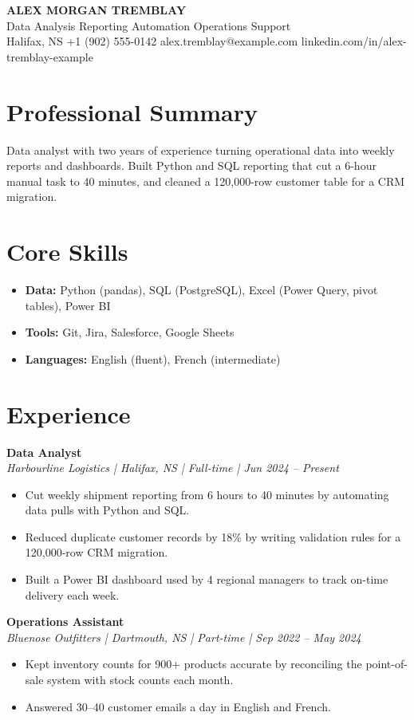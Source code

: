 \documentclass[11pt,letterpaper]{article}
\newcommand{\entry}[2]{\textbf{#1}\\\textit{#2}\par}
\begin{document}
\begin{center}
  {\LARGE\bfseries ALEX MORGAN TREMBLAY}\\[2pt]
  Data Analysis \textbar{} Reporting Automation \textbar{} Operations Support\\[2pt]
  Halifax, NS \textbar{} +1 (902) 555-0142 \textbar{} alex.tremblay@example.com \textbar{} linkedin.com/in/alex-tremblay-example
\end{center}

\section{Professional Summary}
Data analyst with two years of experience turning operational data into weekly reports and dashboards. Built Python
and SQL reporting that cut a 6-hour manual task to 40 minutes, and cleaned a 120,000-row customer table for a
CRM migration.

\section{Core Skills}
\begin{itemize}
  \item \textbf{Data:} Python (pandas), SQL (PostgreSQL), Excel (Power Query, pivot tables), Power BI
  \item \textbf{Tools:} Git, Jira, Salesforce, Google Sheets
  \item \textbf{Languages:} English (fluent), French (intermediate)
\end{itemize}

\section{Experience}
\entry{Data Analyst}{Harbourline Logistics | Halifax, NS | Full-time | Jun 2024 -- Present}
\begin{itemize}
  \item Cut weekly shipment reporting from 6 hours to 40 minutes by automating data pulls with Python and SQL.
  \item Reduced duplicate customer records by 18\% by writing validation rules for a 120,000-row CRM migration.
  \item Built a Power BI dashboard used by 4 regional managers to track on-time delivery each week.
\end{itemize}

\entry{Operations Assistant}{Bluenose Outfitters | Dartmouth, NS | Part-time | Sep 2022 -- May 2024}
\begin{itemize}
  \item Kept inventory counts for 900+ products accurate by reconciling the point-of-sale system with stock counts each month.
  \item Answered 30--40 customer emails a day in English and French.
\end{itemize}
\end{document}
